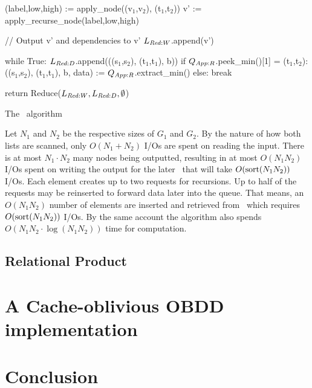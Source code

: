 \begin{lstfloat}[ht!]
\begin{blstlisting}
         (label,low,high) := apply_node((v$_1$,v$_2$), (t$_1$,t$_2$))
         v' := apply_recurse_node(label,low,high)

         // Output v' and dependencies to v'
         $\ReduceLwork$.append(v')

         while True:
             $\ReduceLdep$.append(((s$_1$,s$_2$), (t$_1$,t$_1$), b))
             if $\ApplyQrec$.peek_min()[1] = (t$_1$,t$_2$):
                 ((s$_1$,s$_2$), (t$_1$,t$_1$), b, data) := $\ApplyQrec$.extract_min()
             else: break

     return Reduce($\ReduceLwork, \ReduceLdep, \emptyset$)
  \end{blstlisting}

  \caption{The \Apply\ algorithm}
  \label{lst:apply_algorithm}
\end{lstfloat}

\clearpage
Let $N_1$ and $N_2$ be the respective sizes of $G_1$ and $G_2$. By the nature of
how both lists are scanned, only $O(N_1 + N_2)$ I/Os are spent on reading the
input. There is at most $N_1 \cdot N_2$ many nodes being outputted, resulting in
at most $O(N_1 N_2)$ I/Os spent on writing the output for the later \Reduce\
that will take $O(\text{sort}(N_1 N_2))$ I/Os. Each element creates up to two requests
for recursions. Up to half of the requests may be reinserted to forward data
later into the queue. That means, an $O(N_1 N_2)$ number of elements are
inserted and retrieved from \ApplyQrec\ which requires $O(\text{sort}(N_1 N_2))$ I/Os.
By the same account the algorithm also spends $O(N_1 N_2 \cdot \log (N_1 N_2))$
time for computation. \cite{Arge96}

\subsection{Relational Product}


\section{A Cache-oblivious OBDD implementation} \label{sec:implementation}


\section{Conclusion} \label{sec:conclusion}


